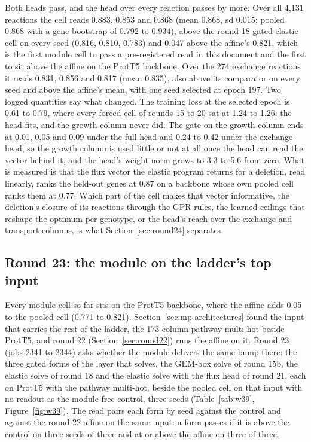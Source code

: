 Both heads pass, and the head over every reaction passes by more. Over all 4,131
reactions the cell reads 0.883, 0.853 and 0.868 (mean 0.868, sd 0.015; pooled 0.868
with a gene bootstrap of 0.792 to 0.934), above the round-18 gated elastic cell on
every seed (0.816, 0.810, 0.783) and 0.047 above the affine's 0.821, which is the first
module cell to pass a pre-registered read in this document and the first to sit above
the affine on the ProtT5 backbone. Over the 274 exchange reactions it reads 0.831,
0.856 and 0.817 (mean 0.835), also above its comparator on every seed and above the
affine's mean, with one seed selected at epoch 197. Two logged quantities say what
changed. The training loss at the selected epoch is 0.61 to 0.79, where every forced
cell of rounds 15 to 20 sat at 1.24 to 1.26: the head fits, and the growth column
never did. The gate on the growth column ends at 0.01, 0.05 and 0.09 under the full
head and 0.24 to 0.42 under the exchange head, so the growth column is used little or
not at all once the head can read the vector behind it, and the head's weight norm
grows to 3.3 to 5.6 from zero. What is measured is that the flux vector the elastic
program returns for a deletion, read linearly, ranks the held-out genes at 0.87 on a
backbone whose own pooled cell ranks them at 0.77. Which part of the cell makes that
vector informative, the deletion's closure of its reactions through the GPR rules,
the learned ceilings that reshape the optimum per genotype, or the head's reach over
the exchange and transport columns, is what Section~\ref{sec:round24} separates.

\subsection{Round 23: the module on the ladder's top input}
\label{sec:round23}

Every module cell so far sits on the ProtT5 backbone, where the affine adds 0.05 to the
pooled cell (0.771 to 0.821). Section~\ref{sec:mp-architectures} found the input that
carries the rest of the ladder, the 173-column pathway multi-hot beside ProtT5, and
round 22 (Section~\ref{sec:round22}) runs the affine on it. Round 23 (jobs 2341 to
2344) asks whether the module delivers the same bump there: the three gated forms of
the layer that solves, the GEM-box solve of round 15b, the elastic solve of round 18
and the elastic solve with the flux head of round 21, each on ProtT5 with the pathway
multi-hot, beside the pooled cell on that input with no readout as the module-free
control, three seeds (Table~\ref{tab:w39}, Figure~\ref{fig:w39}). The read pairs each
form by seed against the control and against the round-22 affine on the same input: a
form passes if it is above the control on three seeds of three and at or above the
affine on three of three.

